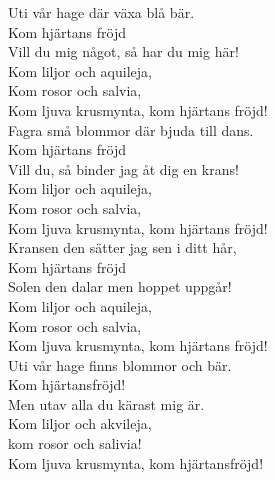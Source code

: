 \documentclass[a6paper, 10pt, twoside]{article}
\begin{document}
\noindent
\begin{center}
\end{center}
\begin{lyrics}
Uti vår hage där växa blå bär.\\
Kom hjärtans fröjd\\
Vill du mig något, så har du mig här!\\
Kom liljor och aquileja,\\
Kom rosor och salvia,\\
Kom ljuva krusmynta, kom hjärtans fröjd!
\vspace{5pt}\\
Fagra små blommor där bjuda till dans.\\
Kom hjärtans fröjd\\
Vill du, så binder jag åt dig en krans!\\
Kom liljor och aquileja,\\
Kom rosor och salvia,\\
Kom ljuva krusmynta, kom hjärtans fröjd!
\vspace{5pt}\\
Kransen den sätter jag sen i ditt hår,\\
Kom hjärtans fröjd\\
Solen den dalar men hoppet uppgår!\\
Kom liljor och aquileja,\\
Kom rosor och salvia,\\
Kom ljuva krusmynta, kom hjärtans fröjd!
\vspace{5pt}\\
Uti vår hage finns blommor och bär. \\
Kom hjärtansfröjd! \\
Men utav alla du kärast mig är. \\
Kom liljor och akvileja,\\
kom rosor och salivia! \\
Kom ljuva krusmynta, kom hjärtansfröjd!
\end{lyrics}
\end{document}

